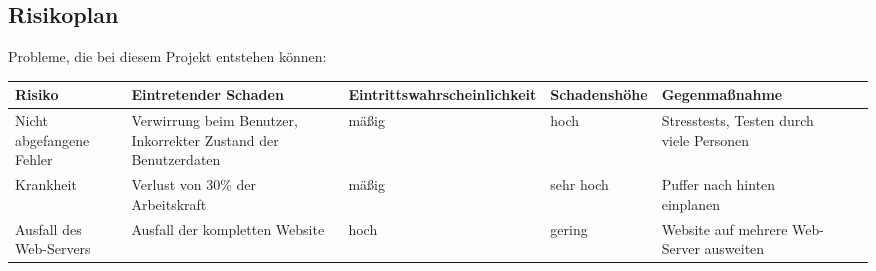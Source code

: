 %
%	

\begin{landscape}
\begin{center}
\section{Risikoplan}
Probleme, die bei diesem Projekt entstehen können:
\medskip

\begin{tabulary}{1.35\textwidth}{|L|L|L|L|L|L|L|}
\hline 
\textbf{Risiko} & \textbf{Eintretender Schaden} & \textbf{Eintrittswahrscheinlichkeit} & \textbf{Schadenshöhe} & \textbf{Gegenmaßnahme} \\ 
\hline 
Nicht abgefangene Fehler & Verwirrung beim Benutzer, Inkorrekter Zustand der Benutzerdaten & mäßig & hoch & Stresstests, Testen durch viele Personen\\ 
\hline
Krankheit & Verlust von 30\% der Arbeitskraft & mäßig & sehr hoch & Puffer nach hinten einplanen \\ 
\hline
Ausfall des Web-Servers & Ausfall der kompletten Website & hoch & gering & Website auf mehrere Web-Server ausweiten \\ 
\hline
\end{tabulary}

\bigskip

\end{center}
\end{landscape}
